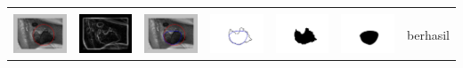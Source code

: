 \begin{table}[H]
\begin{tabular}{|m{0.7in}|m{0.7in}|m{0.7in}|m{0.7in}|m{0.7in}|m{0.7in}|m{0.7in}|}
		&  &  & & & &  \\
		\includegraphics[width=0.7in]{dataset/dataset_3/luka_hitam/ready/19_interp_init.jpg}&
		\includegraphics[width=0.7in]{dataset/dataset_3/luka_hitam/ready/19_interp_ext.jpg}&
		\includegraphics[width=0.7in]{dataset/dataset_3/luka_hitam/ready/19_interp_result.jpg}&
		\includegraphics[width=0.7in]{dataset/dataset_3/luka_hitam/ready/19_gt_r.jpg}&
		\includegraphics[width=0.7in]{dataset/dataset_3/luka_hitam/ready/19_r.jpg}&
		\includegraphics[width=0.7in]{dataset/dataset_3/luka_hitam/ready/19_interp_r.jpg}&
		berhasil\\
		\hline
		

\end{tabular}
\end{table}
